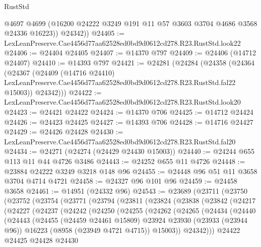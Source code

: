 \begin{lexlean}{RustStd}
\begin{coremodule}
          @4697
          @4699
          (@16200 @24222 @3249 @191 @11 @57 @3603 @3704 @4686 @3568 @24336 @16223))
        @24342))
@24405 := LexLeanPreserve.Cae4456d77aa62528ed0bd9d0612cd278.R23.RustStd.look22
@24406 := @24404 @24405
@24407 := @14370 @797
@24409 := @24406 (@14712 @24407)
@24410 := @14393 @797
@24421 := @24281
    (@24284
      (@24358
        (@24364
          (@24367
            (@24409
              (@14716 @24410)
              LexLeanPreserve.Cae4456d77aa62528ed0bd9d0612cd278.R23.RustStd.fal22
              @15003))
          @24342)))
@24422 := LexLeanPreserve.Cae4456d77aa62528ed0bd9d0612cd278.R23.RustStd.look20
@24423 := @24421 @24422
@24424 := @14370 @706
@24425 := @14712 @24424
@24426 := @24423 @24425
@24427 := @14393 @706
@24428 := @14716 @24427
@24429 := @24426 @24428
@24430 := LexLeanPreserve.Cae4456d77aa62528ed0bd9d0612cd278.R23.RustStd.fal20
@24434 := @24271 (@24274 (@24429 @24430 @15003))
@24440 := @24244 @655 @113 @11 @44 @4726 @3486
@24443 := @24252 @655 @11 @4726
@24448 := @23884 @24222 @3249 @3218 @148 @96
@24455 := @24448 @96 @51 @11 @3658 @3704 @4714 @4721
@24458 := @24327 @96 @101 @96
@24459 := @24458 @3658
@24461 := @14951 (@24332 @96)
@24543 := @23689
    (@23711
      (@23750
        (@23752
          (@23754
            (@23771
              (@23794
                (@23811
                  (@23824
                    (@23838
                      (@23842
                        (@24217
                          (@24227
                            (@24237
                              (@24242
                                (@24250
                                  (@24255
                                    (@24262
                                      (@24265
                                        (@24434
                                          (@24440
                                            (@24443
                                              (@24455
                                                (@24459 @24461 @15809)
                                                @23924
                                                @23930
                                                (@23933 (@23944 @96))
                                                @16223
                                                (@8958 (@23949 @4721 @4715))
                                                @15003))
                                            @24342)))
                                      @24422
                                      @24425
                                      @24428
                                      @24430

\end{coremodule}
\end{lexlean}
